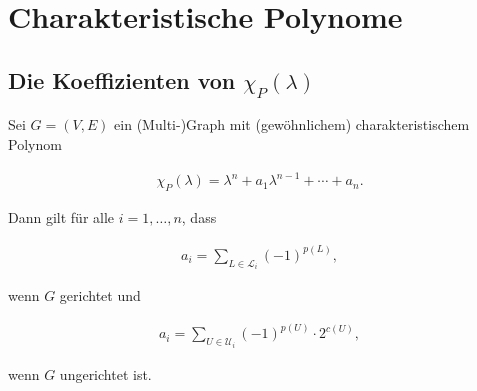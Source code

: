 \chapter{Charakteristische Polynome} \label{chap:characteristic_polynomials}

    \section{Die Koeffizienten von $\chi_P(\lambda)$}

        \begin{theorem}

            Sei $G = (V, E)$ ein (Multi-)Graph mit (gewöhnlichem) charakteristischem Polynom

            \begin{align*}
                \chi_P(\lambda)
                =
                \lambda^n + a_1 \lambda^{n-1} + \cdots + a_n.
            \end{align*}

            Dann gilt für alle $i = 1, \dots, n$, dass

            \begin{align} \label{eq:characteristic_coefficints_directed}
                a_i = \sum_{L \in \mathcal L_i} (-1)^{p(L)},
            \end{align}

            wenn $G$ gerichtet und

            \begin{align} \label{eq:characteristic_coefficints_undirected}
                a_i = \sum_{U \in \mathcal U_i} (-1)^{p(U)} \cdot 2^{c(U)},
            \end{align}

            wenn $G$ ungerichtet ist.

        \end{theorem}

